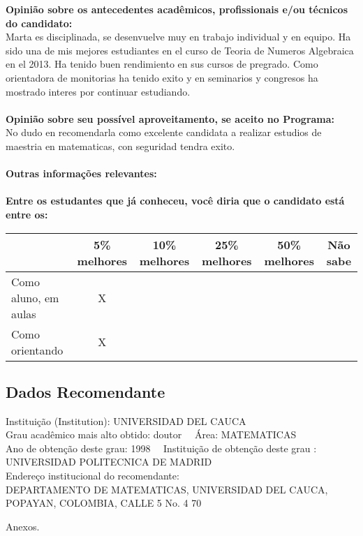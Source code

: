 \documentclass[11pt]{article}
\begin{document}
\textbf{Opinião sobre os antecedentes acadêmicos, profissionais e/ou técnicos do candidato:}
\\Marta es disciplinada, se desenvuelve muy en trabajo individual y en equipo. Ha sido una de mis mejores estudiantes en el curso de Teoria de Numeros Algebraica en el 2013. Ha tenido buen rendimiento en sus cursos de pregrado. Como orientadora de monitorias ha tenido exito y en seminarios y congresos ha mostrado interes por continuar estudiando.\\
\\
\textbf{Opinião sobre seu possível aproveitamento, se aceito no Programa:}
\\No dudo en recomendarla como excelente candidata a realizar estudios de maestria en matematicas, con seguridad tendra exito.\\ 
\\
\textbf{Outras informações relevantes:} \\
\\[0.3cm]
\textbf{Entre os estudantes que já conheceu, você diria que o candidato está entre os:}
\\
\begin{tabular}{|l|c|c|c|c|c|}
\hline
 & 5\% melhores & 10\% melhores & 25\% melhores & 50\% melhores & Não sabe \\
\hline
Como aluno, em aulas & X &  &  &  & \\
\hline
Como orientando & X &  &  &  & \\
\hline
\end{tabular}
\subsection*{Dados Recomendante} 
	Instituição (Institution): UNIVERSIDAD DEL CAUCA
\\ 
	Grau acadêmico mais alto obtido: doutor
	\ \ Área: MATEMATICAS
	\\
	Ano de obtenção deste grau: 1998
	\ \ 
	Instituição de obtenção deste grau : UNIVERSIDAD POLITECNICA DE MADRID
	\\ 
	Endereço institucional do recomendante: \\ DEPARTAMENTO DE MATEMATICAS, UNIVERSIDAD DEL CAUCA, POPAYAN, COLOMBIA, CALLE 5 No. 4 70 
\begin{center}
Anexos.
\end{center}
\end{document}
